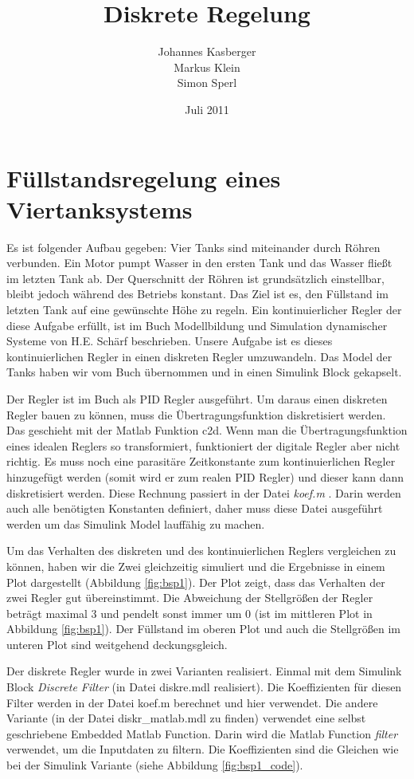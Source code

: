 \documentclass[a4paper]{article}
\title{Diskrete Regelung}
\author{Johannes Kasberger\\Markus Klein\\Simon Sperl}
\date{Juli 2011}
\begin{document}
\maketitle

\section{Füllstandsregelung eines Viertanksystems}

Es ist folgender Aufbau gegeben: Vier Tanks sind miteinander durch Röhren verbunden. Ein Motor pumpt Wasser in den ersten Tank und das Wasser fließt im letzten Tank ab. Der Querschnitt der Röhren ist grundsätzlich einstellbar, bleibt jedoch während des Betriebs konstant. Das Ziel ist es, den Füllstand im letzten Tank auf eine gewünschte Höhe zu regeln. Ein kontinuierlicher Regler der diese Aufgabe erfüllt, ist im Buch Modellbildung und Simulation dynamischer Systeme von H.E. Schärf beschrieben. Unsere Aufgabe ist es dieses kontinuierlichen Regler in einen diskreten Regler umzuwandeln. Das Model der Tanks haben wir vom Buch übernommen und in einen Simulink Block gekapselt. 

Der Regler ist im Buch als PID Regler ausgeführt. Um daraus einen diskreten Regler bauen zu können, muss die Übertragungsfunktion diskretisiert werden. Das geschieht mit der Matlab Funktion c2d. Wenn man die Übertragungsfunktion eines idealen Reglers so transformiert, funktioniert der digitale Regler aber nicht richtig. Es muss noch eine parasitäre Zeitkonstante zum kontinuierlichen Regler hinzugefügt werden (somit wird er zum realen PID Regler) und dieser kann dann diskretisiert werden. Diese Rechnung passiert in der Datei \emph{koef.m }. Darin werden auch alle benötigten Konstanten definiert, daher muss diese Datei ausgeführt werden um das Simulink Model lauffähig zu machen. 

Um das Verhalten des diskreten und des kontinuierlichen Reglers vergleichen zu können, haben wir die Zwei gleichzeitig simuliert und die Ergebnisse in einem Plot dargestellt (Abbildung \ref{fig:bsp1}). Der Plot zeigt, dass das Verhalten der zwei Regler gut übereinstimmt. Die Abweichung der Stellgrößen der Regler beträgt maximal 3 und pendelt sonst immer um 0 (ist im mittleren Plot in Abbildung \ref{fig:bsp1}). Der Füllstand im oberen Plot und auch die Stellgrößen im unteren Plot sind weitgehend deckungsgleich.

Der diskrete Regler wurde in zwei Varianten realisiert. Einmal mit dem Simulink Block \emph{Discrete Filter} (in Datei diskre.mdl realisiert). Die Koeffizienten für diesen Filter werden in der Datei koef.m berechnet und hier verwendet. Die andere Variante (in der Datei diskr\_matlab.mdl zu finden) verwendet eine selbst geschriebene Embedded Matlab Function. Darin wird die Matlab Function \emph{filter} verwendet, um die Inputdaten zu filtern. Die Koeffizienten sind die Gleichen wie bei der Simulink Variante (siehe Abbildung \ref{fig:bsp1_code}).
\end{document}
